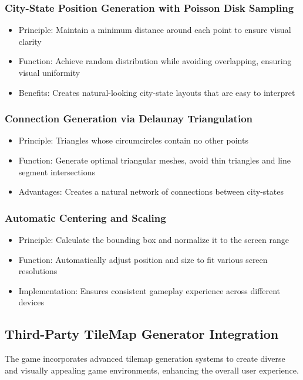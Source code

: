 \documentclass[english]{tudscrreprt}
\begin{document}
\subsubsection{City-State Position Generation with Poisson Disk Sampling}
\begin{itemize}
  \item Principle: Maintain a minimum distance around each point to ensure visual clarity \cite{poisson2007}
  \item Function: Achieve random distribution while avoiding overlapping, ensuring visual uniformity
  \item Benefits: Creates natural-looking city-state layouts that are easy to interpret
\end{itemize}

\subsubsection{Connection Generation via Delaunay Triangulation}
\begin{itemize}
  \item Principle: Triangles whose circumcircles contain no other points \cite{delaunay1934}
  \item Function: Generate optimal triangular meshes, avoid thin triangles and line segment intersections
  \item Advantages: Creates a natural network of connections between city-states
\end{itemize}

\subsubsection{Automatic Centering and Scaling}
\begin{itemize}
  \item Principle: Calculate the bounding box and normalize it to the screen range
  \item Function: Automatically adjust position and size to fit various screen resolutions
  \item Implementation: Ensures consistent gameplay experience across different devices
\end{itemize}

\subsection{Third-Party TileMap Generator Integration}
The game incorporates advanced tilemap generation systems to create diverse and visually appealing game environments, enhancing the overall user experience.
\end{document}
